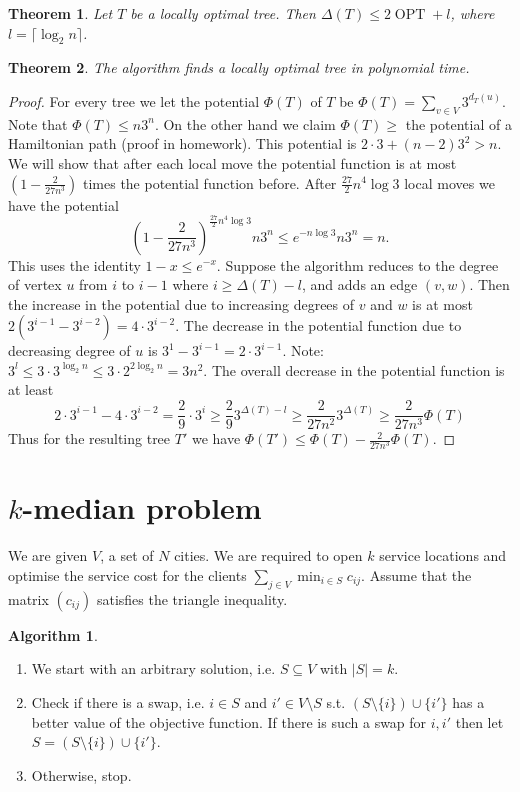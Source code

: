 \documentclass{article}
\newtheorem*{thm}{Theorem}
\theoremstyle{definition}
\newtheorem*{alg}{Algorithm}
\DeclareMathOperator{\OPT}{OPT}
\begin{document}
\begin{thm}
Let $T$ be a locally optimal tree.
Then $\Delta(T)\le 2\OPT + l$, where $l=\lceil \log_2n \rceil$.
\end{thm}

\begin{thm}
The algorithm finds a locally optimal tree in polynomial time.
\end{thm}

\begin{proof}
For every tree we let the potential $\Phi(T)$ of $T$ be $\Phi(T) = \sum_{v\in V} 3^{d_T(u)}$. \\
Note that $\Phi(T) \le n3^n$.
On the other hand we claim $\Phi(T) \ge$ the potential of a Hamiltonian path (proof in homework).
This potential is $2\cdot3 + (n-2)3^2> n$.
We will show that after each local move the potential function is at most $(1-\frac{2}{27n^3})$ times the potential function before.
After $\frac{27}{2}n^4\log3$ local moves we have the potential $$\left(1-\frac{2}{27n^3}\right)^{\frac{27}{2}n^4\log 3} n3^n \le e^{-n\log 3}n3^n = n.$$
This uses the identity $1-x \le e^{-x}$.
Suppose the algorithm reduces to the degree of vertex $u$ from $i$ to $i-1$ where $i\ge \Delta(T) - l$, and adds an edge $(v,w)$.
Then the increase in the potential due to increasing degrees of $v$ and $w$ is at most $2(3^{i-1} -3^{i-2}) = 4\cdot3^{i-2}$.
The decrease in the potential function due to decreasing degree of $u$ is $3^1 - 3^{i-1} = 2\cdot3^{i-1}$.
Note: $3^l \le 3\cdot 3^{\log_2 n}\le 3\cdot2^{2\log_2 n} = 3n^2$.
The overall decrease in the potential function is at least $$2\cdot 3^{i-1}-4\cdot 3^{i-2} = \frac{2}{9}\cdot 3^i\ge \frac{2}{9}3^{\Delta(T) - l}\ge \frac{2}{27n^2}3^{\Delta(T)} \ge \frac{2}{27n^3}\Phi(T)$$
Thus for the resulting tree $T'$ we have $\Phi(T') \le \Phi(T) - \frac{2}{27n^3}\Phi(T)$.
\end{proof}

\section{$k$-median problem}
We are given $V$, a set of $N$ cities.
We are required to open $k$ service locations and optimise the service cost for the clients $\sum_{j\in V} \min_{i\in S} c_{ij}$.
Assume that the matrix $(c_{ij})$ satisfies the triangle inequality.


\begin{alg}~\\
\begin{enumerate}
\item We start with an arbitrary solution, i.e. $S\subseteq V$ with $|S| = k$.
\item Check if there is a swap, i.e. $i\in S$ and $i'\in V\setminus S$ s.t. $(S\setminus\{i\})\cup\{i'\}$ has a better value of the objective function.
If there is such a swap for $i,i'$ then let $S=(S\setminus\{i\})\cup\{i'\}$.
\item Otherwise, stop.
\end{enumerate}
\end{alg}
\end{document}

